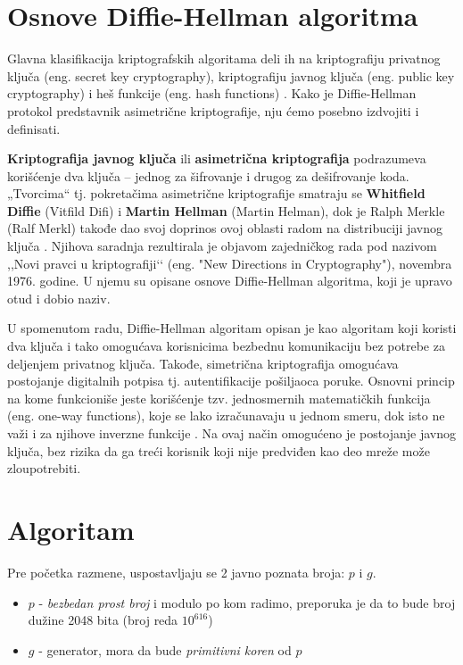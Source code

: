 \documentclass[a4paper]{article}
\begin{document}
\section{Osnove Diffie-Hellman algoritma}
Glavna klasifikacija kriptografskih algoritama deli ih na kriptografiju privatnog ključa (eng. secret key cryptography), kriptografiju javnog ključa (eng. public key cryptography) i heš funkcije (eng. hash functions) \cite{cryptography}. Kako je Diffie-Hellman protokol predstavnik asimetrične kriptografije, nju ćemo posebno izdvojiti i definisati.

\textbf{Kriptografija javnog ključa} ili \textbf{asimetrična kriptografija} podrazumeva korišćenje dva ključa – jednog za šifrovanje i drugog za dešifrovanje koda. „Tvorcima“ tj. pokretačima asimetrične kriptografije smatraju se \textbf{Whitfield Diffie} (Vitfild Difi) i \textbf{Martin Hellman} (Martin Helman), dok je Ralph Merkle (Ralf Merkl) takođe dao svoj doprinos ovoj oblasti radom na distribuciji javnog ključa \cite{Diffie-Hellman}. Njihova saradnja rezultirala je objavom zajedničkog rada pod nazivom ,,Novi pravci u kriptografiji‘‘ (eng. "New Directions in Cryptography"), novembra 1976. godine. U njemu su opisane osnove Diffie-Hellman algoritma, koji je upravo otud i dobio naziv. %

U spomenutom radu, Diffie-Hellman algoritam opisan je kao algoritam koji koristi dva ključa i tako omogućava korisnicima bezbednu komunikaciju bez potrebe za deljenjem privatnog ključa. Takođe, simetrična kriptografija omogućava postojanje digitalnih potpisa tj. autentifikacije pošiljaoca poruke. Osnovni princip na kome funkcioniše jeste korišćenje tzv. jednosmernih matematičkih funkcija (eng. one-way functions), koje se lako izračunavaju u jednom smeru, dok isto ne važi i za njihove inverzne funkcije \cite{cryptography}. Na ovaj način omogućeno je postojanje javnog ključa, bez rizika da ga treći korisnik koji nije predviđen kao deo mreže može zloupotrebiti. 



\section{Algoritam}
\label{sec:algoritam}

Pre početka razmene, uspostavljaju se 2 javno poznata broja: $p$ i $g$.
\begin{itemize}

    \item $p$ - \emph{bezbedan prost broj} i modulo po kom radimo, preporuka je da 
        to bude broj dužine 2048 bita (broj reda $10^{616}$) \cite{logjam}
    \item $g$ - generator, mora da bude \emph{primitivni koren} od $p$

\end{itemize}
\end{document}
